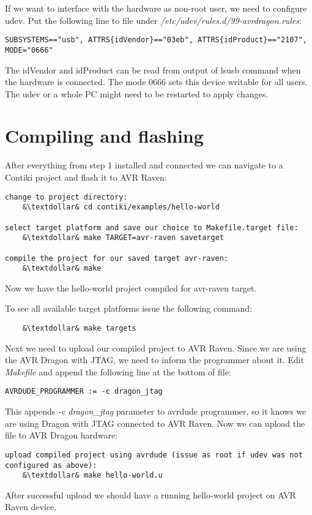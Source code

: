 \documentclass{article}
\begin{document}
If we want to interface with the hardware as non-root user, we need to configure udev.
Put the following line to file under {\it{/etc/udev/rules.d/99-avrdragon.rules}}:
\begin{lstlisting}
SUBSYSTEMS=="usb", ATTRS{idVendor}=="03eb", ATTRS{idProduct}=="2107", MODE="0666"
\end{lstlisting}
The idVendor and idProduct can be read from output of lsusb command when the hardware is connected.
The mode 0666 sets this device writable for all users.
The udev or a whole PC might need to be restarted to apply changes.


\section{Compiling and flashing}
After everything from step 1 installed and connected we can navigate to a Contiki project and flash it to AVR Raven:
\begin{lstlisting}
change to project directory:
	&\textdollar& cd contiki/examples/hello-world
	
select target platform and save our choice to Makefile.target file:
	&\textdollar& make TARGET=avr-raven savetarget
	
compile the project for our saved target avr-raven:
	&\textdollar& make
\end{lstlisting}
Now we have the hello-world project compiled for avr-raven target.

To see all available target platforms issue the following command:
\begin{lstlisting}
	&\textdollar& make targets
\end{lstlisting}

Next we need to upload our compiled project to AVR Raven.
Since we are using the AVR Dragon with JTAG, we need to inform the programmer about it.
Edit {\it{Makefile}} and append the following line at the bottom of file:
\begin{lstlisting}
AVRDUDE_PROGRAMMER := -c dragon_jtag
\end{lstlisting}

This appends {\it{-c dragon\_jtag}} parameter to avrdude programmer, so it knows we are using Dragon with JTAG connected to AVR Raven.
Now we can upload the file to AVR Dragon hardware:
\begin{lstlisting}
upload compiled project using avrdude (issue as root if udev was not configured as above):
	&\textdollar& make hello-world.u
\end{lstlisting}
After successful upload we should have a running hello-world project on AVR Raven device.
\end{document}
